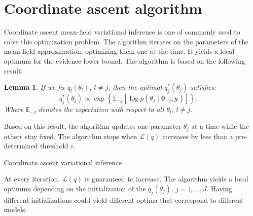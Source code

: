 \documentclass[a4paper, 11pt]{report}
\numberwithin{equation}{chapter}
\newtheorem{lemma}{Lemma}[chapter]
\begin{document}
\section{Coordinate ascent algorithm}
Coordinate ascent mean-field variational inference  is one of commonly used to solve this optimization problem. The algorithm iterates on the parameters of the mean-field approximation, optimizing them one at the time. It yields a local optimum for the evidence lower bound. The algorithm is based on the following result:
\begin{lemma}

If we fix $q_l(\theta_l)$, $l\neq j$, then the optimal $q^*_j(\theta_j)$ satisfies:
\begin{equation*}
q^*_j(\theta_j) \propto \exp\left\lbrace\mathbb{E}_{-j}\left[\log p(\theta_j \mid \boldsymbol{\theta}_{-j}, \boldsymbol{y})\right]\right\rbrace.
\end{equation*}
Where $\mathbb{E}_{-j}$ denotes the expectation with respect to all $\theta_l$, $l \neq j$.
\end{lemma}

Based on this result, the algorithm updates one parameter $\theta_j$ at a time while the others stay fixed. The algorithm stops when $\mathcal{L}(q)$ increases by less than a pre-determined threshold $\varepsilon$.

\begin{algorithm}
\BlankLine
{}
\BlankLine
{}
\BlankLine
{}
\caption{Coordinate ascent variational inference \label{alg:CAVI}}
\end{algorithm}
At every iteration, $\mathcal{L}(q)$ is guaranteed to increase. The algorithm yields a local optimum depending on the initialization of the $q_j(\theta_j)$, $j=1,\ldots,J$. Having different initializations could yield different optima that correspond to different models.
\end{document}
